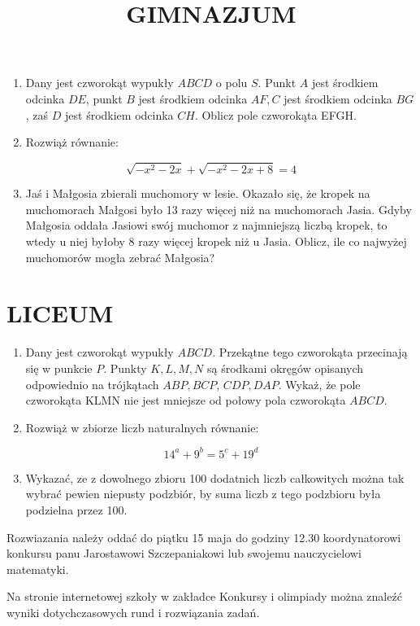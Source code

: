\documentclass[10pt]{article}
\title{GIMNAZJUM }
\author{}
\date{}
\begin{document}
\maketitle
\begin{enumerate}
  \item Dany jest czworokąt wypukły \(A B C D\) o polu \(S\). Punkt \(A\) jest środkiem odcinka \(D E\), punkt \(B\) jest środkiem odcinka \(A F, C\) jest środkiem odcinka \(B G\), zaś \(D\) jest środkiem odcinka \(C H\). Oblicz pole czworokąta EFGH.
  \item Rozwiąż równanie:
\end{enumerate}

\[
\sqrt{-x^{2}-2 x}+\sqrt{-x^{2}-2 x+8}=4
\]

\begin{enumerate}
  \setcounter{enumi}{2}
  \item Jaś i Małgosia zbierali muchomory w lesie. Okazało się, że kropek na muchomorach Małgosi było 13 razy więcej niż na muchomorach Jasia. Gdyby Małgosia oddała Jasiowi swój muchomor z najmniejszą liczbą kropek, to wtedy u niej byłoby 8 razy więcej kropek niż u Jasia. Oblicz, ile co najwyżej muchomorów mogła zebrać Małgosia?
\end{enumerate}

\section*{LICEUM}
\begin{enumerate}
  \item Dany jest czworokąt wypukły \(A B C D\). Przekątne tego czworokąta przecinają się w punkcie \(P\). Punkty \(K, L, M, N\) są środkami okręgów opisanych odpowiednio na trójkątach \(A B P, B C P\), \(C D P, D A P\). Wykaż, że pole czworokąta KLMN nie jest mniejsze od połowy pola czworokąta \(A B C D\).
  \item Rozwiąż w zbiorze liczb naturalnych równanie:
\end{enumerate}

\[
14^{a}+9^{b}=5^{c}+19^{d}
\]

\begin{enumerate}
  \setcounter{enumi}{2}
  \item Wykazać, ze z dowolnego zbioru 100 dodatnich liczb całkowitych można tak wybrać pewien niepusty podzbiór, by suma liczb z tego podzbioru była podzielna przez 100.
\end{enumerate}

Rozwiazania należy oddać do piątku 15 maja do godziny 12.30 koordynatorowi konkursu panu Jarostawowi Szczepaniakowi lub swojemu nauczycielowi matematyki.

Na stronie internetowej szkoły w zakładce Konkursy i olimpiady można znaleźć wyniki dotychczasowych rund i rozwiązania zadań.
\end{document}
